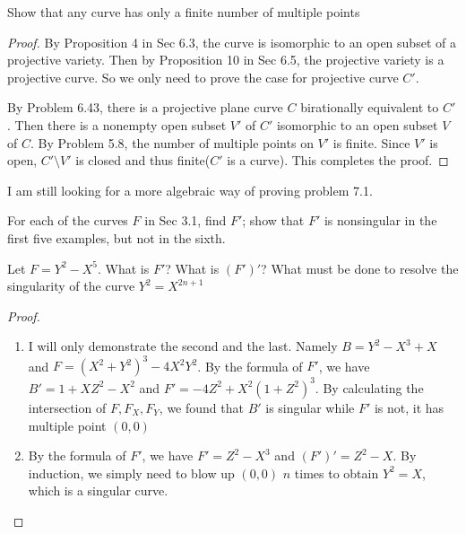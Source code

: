 \documentclass{solution}
\begin{document}
\begin{problem}{7.1}
    Show that any curve has only a finite number of multiple points
\end{problem}

\begin{proof}
    By Proposition 4 in Sec 6.3, the curve is isomorphic to an open subset of a projective variety. Then by Proposition 10 in Sec 6.5, the projective variety is a projective curve. So we only need to prove the case for projective curve $C'$.

    By Problem 6.43, there is a projective plane curve $C$ birationally equivalent to $C'$. Then there is a nonempty open subset $V'$ of $C'$ isomorphic to an open subset $V$ of $C$. By Problem 5.8, the number of multiple points on $V'$ is finite. Since $V'$ is open, $C' \setminus V'$ is closed and thus finite($C'$ is a curve). This completes the proof.
\end{proof}

{\color{red} I am still looking for a more algebraic way of proving problem 7.1.}

\begin{problem}{7.2}
    \begin{inparaenum}
        \item For each of the curves $F$ in Sec 3.1, find $F'$; show that $F'$ is nonsingular in the first five examples, but not in the sixth.
        \item Let $F = Y^2 - X^5$. What is $F'$? What is $(F')'$? What must be done to resolve the singularity of the curve $Y^2 = X^{2n + 1}$
    \end{inparaenum}
\end{problem}

\begin{proof}
    \begin{enumerate}
        \item I will only demonstrate the second and the last. Namely $B = Y^2 - X^3 + X$ and $F = (X^2 + Y^2)^3 - 4X^2Y^2$. By the formula of $F'$, we have $B' = 1 + XZ^2 - X^2$ and $F' = -4Z^2 + X^2(1 + Z^2)^3$. By calculating the intersection of $F, F_X, F_Y$, we found that $B'$ is singular while $F'$ is not, it has multiple point $(0, 0)$
        \item By the formula of $F'$, we have $F' = Z^2 - X^3$ and $(F')' = Z^2 - X$. By induction, we simply need to blow up $(0, 0)$ $n$ times to obtain $Y^2 = X$, which is a singular curve.
    \end{enumerate}
\end{proof}
\end{document}
